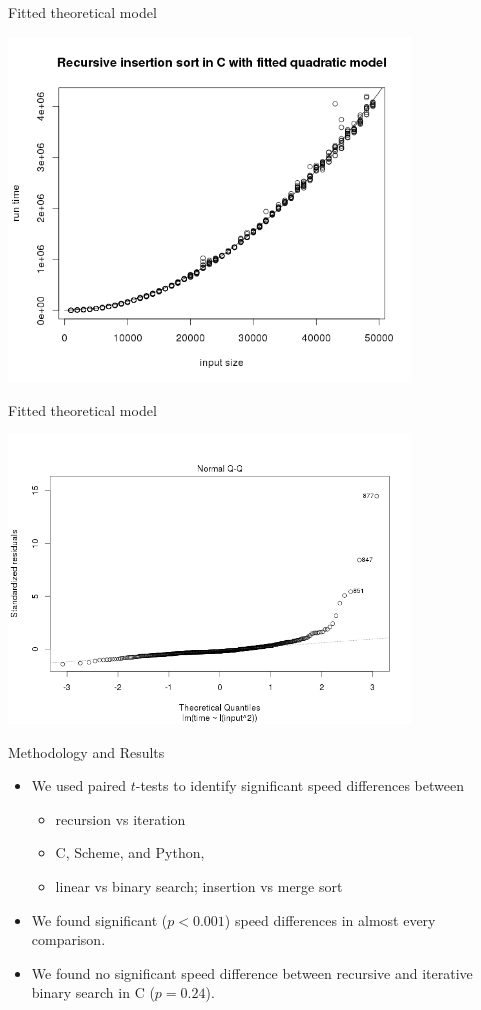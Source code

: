 \documentclass[]{beamer}
\begin{document}
\begin{frame}[t]{Fitted theoretical model}
\begin{center}
	\includegraphics[width=0.8\textwidth]{plots/r-quadratic-regression.png}
\end{center}
\end{frame}

\begin{frame}[t]{Fitted theoretical model}
\begin{center}
	\includegraphics[width=0.8\textwidth]{plots/qq-plot.png}
\end{center}
\end{frame}

\begin{frame}[t]{Methodology and Results}
\begin{itemize}
	\item We used paired $t$-tests to identify significant speed differences between
    \begin{itemize}
		\item recursion vs iteration
        \item C, Scheme, and Python,
        \item linear vs binary search; insertion vs merge sort
\end{itemize}
	\item We found significant ($p < 0.001$) speed differences in almost every comparison.
    \item We found no significant speed difference between recursive and iterative binary search in C ($p = 0.24$).
\end{itemize}
\end{frame}
\end{document}
